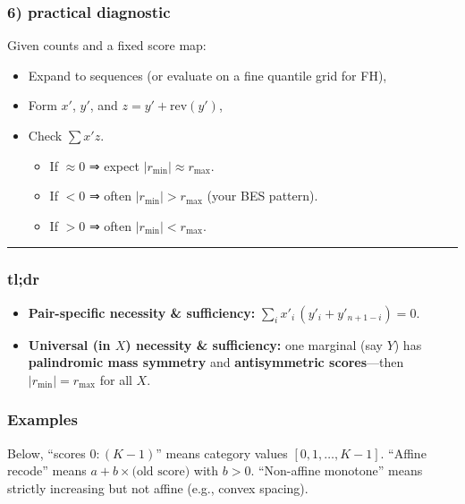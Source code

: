 \documentclass[
  letterpaper,
  DIV=11,
  numbers=noendperiod]{scrartcl}
\theoremstyle{remark}
\begin{document}
\subsubsection{6) practical diagnostic}\label{practical-diagnostic}

Given counts and a fixed score map:

\begin{itemize}
\item
  Expand to sequences (or evaluate on a fine quantile grid for FH),
\item
  Form \(x'\), \(y'\), and \(z=y'+\text{rev}(y')\),
\item
  Check \(\sum x' z\).

  \begin{itemize}
  \item
    If \(\approx 0\) ⇒ expect \(|r_{\min}|\approx r_{\max}\).
  \item
    If \(<0\) ⇒ often \(|r_{\min}|>r_{\max}\) (your BES pattern).
  \item
    If \(>0\) ⇒ often \(|r_{\min}|<r_{\max}\).
  \end{itemize}
\end{itemize}

\begin{center}\rule{0.5\linewidth}{0.5pt}\end{center}

\subsubsection{tl;dr}\label{tldr}

\begin{itemize}
\item
  \textbf{Pair-specific necessity \& sufficiency:}
  \(\sum_i x'_i\,(y'_i+y'_{n+1-i})=0\).
\item
  \textbf{Universal (in \(X\)) necessity \& sufficiency:} one marginal
  (say \(Y\)) has \textbf{palindromic mass symmetry} and
  \textbf{antisymmetric scores}---then \(|r_{\min}|=r_{\max}\) for all
  \(X\).
\end{itemize}

\subsubsection{Examples}\label{examples}

Below, ``scores \(0{:}(K-1)\)'' means category values
\([0,1,\dots,K-1]\). ``Affine recode'' means
\(a+b\times\text{(old score)}\) with \(b>0\). ``Non-affine monotone''
means strictly increasing but not affine (e.g., convex spacing).
\end{document}
